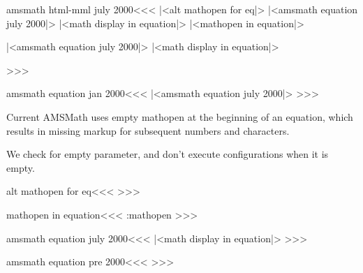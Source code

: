 \<amsmath html-mml july 2000\><<<
|<alt mathopen for eq|>
  {\ifvmode \IgnorePar\fi\EndP
   |<amsmath equation july 2000|>%
   |<math display in equation|>%
   |<mathopen in equation|>
  }
  {\ifvmode \IgnorePar\fi\EndP
   }
  {\ifvmode \IgnorePar\fi\EndP {}%
   \ShowPar\IgnoreIndent\par}
  {\ifvmode \IgnorePar\fi\EndP
   |<amsmath equation july 2000|>%
   |<math display in equation|>%
  }
  {\ifvmode \IgnorePar\fi\EndP {}%
   \ShowPar\IgnoreIndent\par}
>>>


   



\<amsmath equation jan 2000\><<<
|<amsmath equation july 2000|>%
>>>

Current AMSMath uses empty mathopen at the beginning of an equation, 
which results in missing markup for subsequent numbers and characters.

We check for empty parameter, and don't execute configurations when it is empty.

\<alt mathopen for eq\><<<
\def\eq:mathopen#1{\ifx\relax#1\relax\else\a:mathopen\fi\o:mathopen:{#1}}
>>>

\<mathopen in equation\><<<
\let\mathopen\eq:mathopen%
>>>





\<amsmath equation july 2000\><<<
     {\IgnorePar 
         |<math display in equation|>}
     {}
     {}
     {}
     {\ifnum{} \IgnorePar
         \fi }
     {}
>>>

\<amsmath equation pre 2000\><<<
\Configure{$$}{}{}{}%
  {\Configure{$$}
    {\IgnorePar\EndP\DviMath}
    {\EndDviMath\EndP}%
    {}%
   \IgnorePar
  }{}{}{}{}{}
>>>









